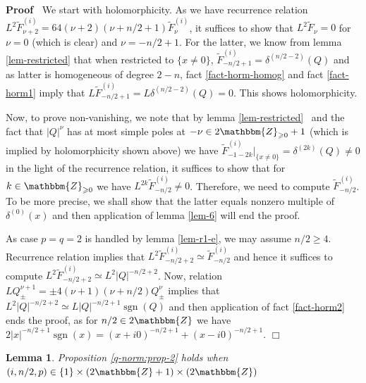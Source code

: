 \documentclass{article}
\newcommand{\tmop}[1]{\ensuremath{\operatorname{#1}}}
\newenvironment{proof}{\noindent\textbf{Proof\ }}{\hspace*{\fill}$\Box$\medskip}
\numberwithin{definition}{section}
\newtheorem{lemma}{Lemma}
\numberwithin{lemma}{section}
\numberwithin{proposition}{section}
{\theorembodyfont{\rmfamily}\newtheorem{remark}{Remark}
\numberwithin{remark}{section}
}
\begin{document}
\begin{proof}
  We start with holomorphicity. As we have recurrence relation $L^2
  \tilde{F}_{\nu + 2}^{( i)} = 64 ( \nu + 2) ( \nu + n / 2 + 1)
  \tilde{F}_{\nu}^{( i)}$, it suffices to show that $L^2 \tilde{F}_{\nu} = 0$
  for $\nu = 0$ (which is clear) and $\nu = - n / 2 + 1$. For the latter, we
  know from lemma \ref{lem-restricted} that when restricted to $\{ x \neq 0
  \}$, $\tilde{F}^{( i)}_{- n / 2 + 1} = \delta^{( n / 2 - 2)} ( Q)$ and as
  latter is homogeneous of degree $2 - n$, fact \ref{fact-horm-homog} and fact
  \ref{fact-horm1} imply that $L \tilde{F}^{( i)}_{- n / 2 + 1} = L \delta^{(
  n / 2 - 2)} ( Q) = 0$. This shows holomorphicity.
  
  Now, to prove non-vanishing, we note that by lemma \ref{lem-restricted} \
  and the fact that $| Q |^{\nu}$ has at most simple poles at $- \nu \in
  2\mathbbm{Z}_{\geqslant 0} + 1$ (which is implied by holomorphicity shown
  above) we have $\tilde{F}_{- 1 - 2 k}^{( i)} |_{\{ x \neq 0 \}} = \delta^{(
  2 k)} ( Q) \neq 0$ in the light of the recurrence relation, it suffices to
  show that for $k \in \mathbbm{Z}_{\geqslant 0}$ we have $L^{2 k}
  \tilde{F}_{- n / 2}^{( i)} \neq 0$. Therefore, we need to compute
  $\tilde{F}^{( i)}_{- n / 2}$. To be more precise, we shall show that the
  latter equals nonzero multiple of $\delta^{( 0)} ( x)$ and then application
  of lemma \ref{lem-6} will end the proof.
  
  As case $p = q = 2$ is handled by lemma \ref{lem-r1-e}, we may assume $n /
  2 \geqslant 4$. Recurrence relation implies that $L^2 \tilde{F}_{- n / 2 +
  2}^{( i)} \simeq \tilde{F}^{( i)}_{- n / 2}$ and hence it suffices to
  compute $L^2 \tilde{F}_{- n / 2 + 2}^{( i)} \simeq L^2 | Q |^{- n / 2 + 2}$.
  Now, relation $L Q_{\pm}^{\nu + 1} = \pm 4 ( \nu + 1) ( \nu + n / 2)
  Q_{\pm}^{\nu}$ implies that $L^2 | Q |^{- n / 2 + 2} \simeq L | Q |^{- n / 2
  + 1} \tmop{sgn} ( Q)$ and then application of fact \ref{fact-horm2} ends the
  proof, as for $n / 2 \in 2\mathbbm{Z}$ we have $2 | x |^{- n / 2 + 1}
  \tmop{sgn} ( x) = ( x + i 0)^{- n / 2 + 1} + ( x - i 0)^{- n / 2 + 1}$.
\end{proof}

\begin{lemma}
  \label{lem-r4}Proposition \ref{q-norm:prop-2} holds when $( i, n / 2, p) \in
  \{ 1 \} \times ( 2\mathbbm{Z}+ 1) \times ( 2\mathbbm{Z})$
\end{lemma}
\end{document}
